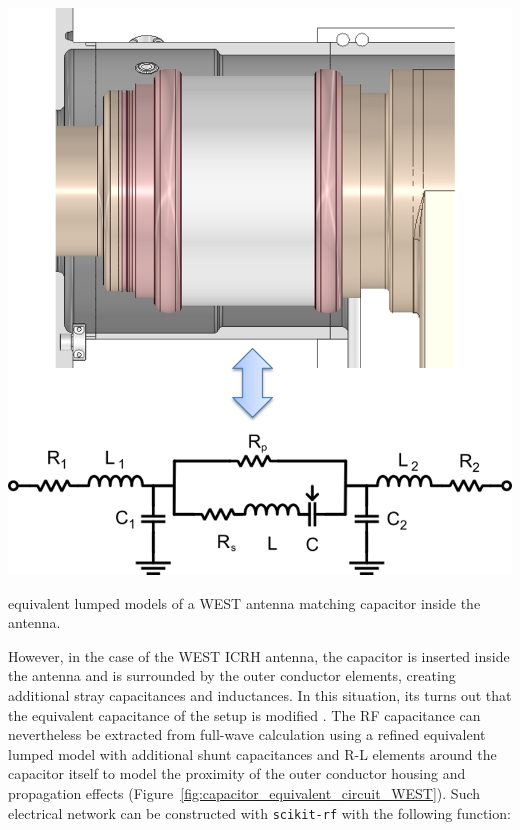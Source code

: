 {\begin{marginfigure}
	\centering
	\includegraphics[width=1.0\linewidth]{figures/chap3/WEST_ICRH/capacitor_equivalent_circuit_WEST}
	\caption{equivalent lumped models of a WEST antenna matching capacitor inside the antenna.}
	\label{fig:capacitor_equivalent_circuit_WEST}	  
\end{marginfigure}

However, in the case of the WEST ICRH antenna, the capacitor is inserted inside the antenna and is surrounded by the outer conductor elements, creating additional stray capacitances and inductances. In this situation, its turns out that the equivalent capacitance of the setup is modified \cite{helou2018}. The RF capacitance can nevertheless be extracted from full-wave calculation using a refined equivalent lumped model with additional shunt capacitances and R-L elements around the capacitor itself to model the proximity of the outer conductor housing and propagation effects (Figure~\ref{fig:capacitor_equivalent_circuit_WEST}). Such electrical network can be constructed with \texttt{scikit-rf} with the following function:

}
